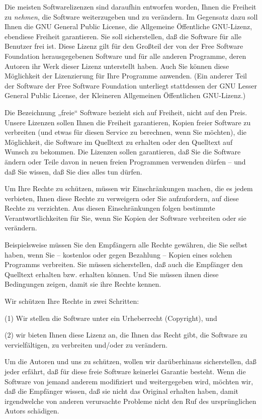 {\small

Die meisten Softwarelizenzen sind daraufhin entworfen worden, Ihnen die Freiheit zu \textit{nehmen}, die Software weiterzugeben und zu verändern. Im Gegensatz dazu soll Ihnen die GNU General Public License, die Allgemeine Öffentliche GNU-Lizenz, ebendiese Freiheit garantieren. Sie soll sicherstellen, daß die Software für alle Benutzer frei ist. Diese Lizenz gilt für den Großteil der von der Free Software Foundation herausgegebenen Software und für alle anderen Programme, deren Autoren ihr Werk dieser Lizenz unterstellt haben. Auch Sie können diese Möglichkeit der Lizenzierung für Ihre Programme anwenden. (Ein anderer Teil der Software der Free Software Foundation unterliegt stattdessen der GNU Lesser General Public License, der Kleineren Allgemeinen Öffentlichen GNU-Lizenz.)

Die Bezeichnung „freie“ Software bezieht sich auf Freiheit, nicht auf den Preis. Unsere Lizenzen sollen Ihnen die Freiheit garantieren, Kopien freier Software zu verbreiten (und etwas für diesen Service zu berechnen, wenn Sie möchten), die Möglichkeit, die Software im Quelltext zu erhalten oder den Quelltext auf Wunsch zu bekommen. Die Lizenzen sollen garantieren, daß Sie die Software ändern oder Teile davon in neuen freien Programmen verwenden dürfen – und daß Sie wissen, daß Sie dies alles tun dürfen.

Um Ihre Rechte zu schützen, müssen wir Einschränkungen machen, die es jedem verbieten, Ihnen diese Rechte zu verweigern oder Sie aufzufordern, auf diese Rechte zu verzichten. Aus diesen Einschränkungen folgen bestimmte Verantwortlichkeiten für Sie, wenn Sie Kopien der Software verbreiten oder sie verändern.

Beispielsweise müssen Sie den Empfängern alle Rechte gewähren, die Sie selbst haben, wenn Sie – kostenlos oder gegen Bezahlung – Kopien eines solchen Programms verbreiten. Sie müssen sicherstellen, daß auch die Empfänger den Quelltext erhalten bzw. erhalten können. Und Sie müssen ihnen diese Bedingungen zeigen, damit sie ihre Rechte kennen.

Wir schützen Ihre Rechte in zwei Schritten: 

(1) Wir stellen die Software unter ein Urheberrecht (Copyright), und 

(2) wir bieten Ihnen diese Lizenz an, die Ihnen das Recht gibt, die Software zu vervielfältigen, zu verbreiten und/oder zu verändern.

Um die Autoren und uns zu schützen, wollen wir darüberhinaus sicherstellen, daß jeder erfährt, daß für diese freie Software keinerlei Garantie besteht. Wenn die Software von jemand anderem modifiziert und weitergegeben wird, möchten wir, daß die Empfänger wissen, daß sie nicht das Original erhalten haben, damit irgendwelche von anderen verursachte Probleme nicht den Ruf des ursprünglichen Autors schädigen.

}
